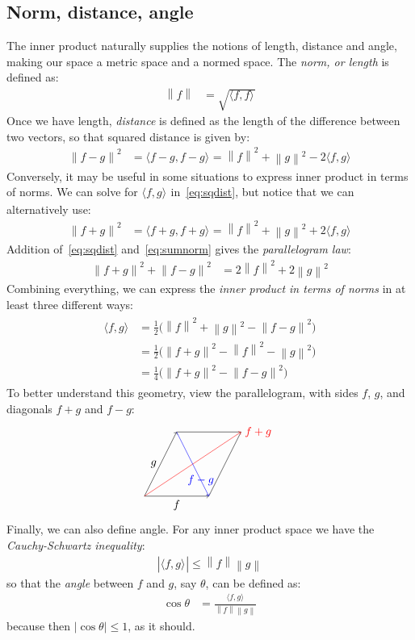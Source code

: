 \documentclass[a4paper,oneside,12pt,english]{report}
\DeclareMathOperator{\abs}{abs}
\def\expv#1#2{\bigl\langle#1\bigr\rangle_{#2}}
\def\dot#1#2{\expv{#1,#2}{}}
\begin{document}
\subsection{Norm, distance, angle}
\def\norm#1{\left\lVert#1\right\rVert}
\def\abs#1{\left\lvert#1\right\rvert}
The inner product naturally supplies the notions of length, distance and angle, making our space a metric space and a normed space. The \emph{norm, or length} is defined as:
\begin{align}
\norm{f} &= \sqrt{\dot{f}{f}}
\end{align}
Once we have length, \emph{distance} is defined as the length of the difference between two vectors, so that squared distance is given by:
\begin{align}
\label{eq:sqdist}
\norm{f-g}^2 &= \dot{f-g}{f-g} = \norm{f}^2 +\norm{g}^2 -2\dot{f}{g}
\end{align}
Conversely, it may be useful in some situations to express inner product in terms of norms. We can solve for $\dot{f}{g}$ in~\eqref{eq:sqdist}, but notice that we can alternatively use:
\begin{align}
\label{eq:sumnorm}
\norm{f+g}^2 &= \dot{f+g}{f+g} = \norm{f}^2 +\norm{g}^2 +2\dot{f}{g}
\end{align}
Addition of~\eqref{eq:sqdist} and~\eqref{eq:sumnorm} gives the \emph{parallelogram law}:
\begin{align}
\label{eq:parlaw}
\norm{f+g}^2 + \norm{f-g}^2&= 2\norm{f}^2 +2\norm{g}^2
\end{align}
Combining everything, we can express the \emph{inner product in terms of norms} in at least three different ways:
\begin{align}
\label{eq:dotvianorms}
\begin{split}
\dot{f}{g} &= \frac12\bigl(\norm{f}^2+\norm{g}^2 - \norm{f-g}^2\bigr) \\
&= \frac12\bigl(\norm{f+g}^2 - \norm{f}^2- \norm{g}^2\bigr)  \\
&= \frac14\bigl(\norm{f+g}^2-\norm{f-g}^2\bigr)
\end{split}
\end{align}
To better understand this geometry, view the parallelogram, with sides $f$, $g$, and diagonals $f+g$ and $f-g$: 
$$
\begin{tikzpicture}[xscale=1,yscale=1]
\draw[->] (0,0) -- node[left]{$g$} (1,2);  %
\draw (1,2) -- (3,2) -- (2,0);
\draw[->] (0,0) -- node[below]{$f$} (2,0); %
\draw[->,red] (0,0) --  (3,2) node[right]{$f+g$}; %
\draw[->,blue] (1,2) --node[near end] {$f-g$} (2,0); %
\end{tikzpicture}
$$
Finally, we can also define angle. For any inner product space we have the \emph{Cauchy-Schwartz inequality}:
\begin{align}
\label{eq:CSI}
\abs{\dot{f}{g}} \le \norm{f}\norm{g}
\end{align}	
so that the \emph{angle} between $f$ and $g$, say $\theta$, can be defined as:
\begin{align}
\cos\theta &= \frac{\dot{f}{g}}{\norm{f}\norm{g}}
\end{align}	
because then $\abs{\cos\theta}\le1$, as it should. 
\end{document}
